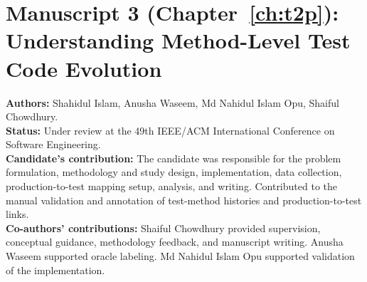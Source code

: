 \section*{Manuscript 3 (Chapter~\ref{ch:t2p}): Understanding Method-Level Test Code Evolution}
\textbf{Authors:} Shahidul Islam, Anusha Waseem, Md Nahidul Islam Opu, Shaiful Chowdhury.\\
\textbf{Status:} Under review at the 49th IEEE/ACM International Conference on Software Engineering.\\
\textbf{Candidate's contribution:} The candidate was responsible for the problem formulation, methodology and study design, implementation, data collection, production-to-test mapping setup, analysis, and writing. Contributed to the manual validation and annotation of test-method histories and production-to-test links.\\
\textbf{Co-authors' contributions:} Shaiful Chowdhury provided supervision, conceptual guidance, methodology feedback, and manuscript writing. Anusha Waseem supported oracle labeling. Md Nahidul Islam Opu supported validation of the implementation.
